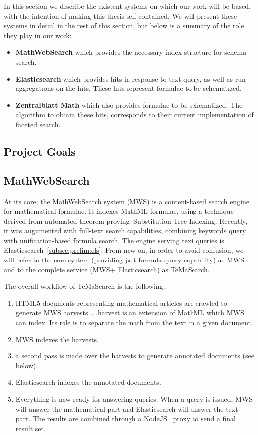 \documentclass[a4paper,11pt,oneside]{article}
\def\MWS{\textsf{MWS}\xspace}
\def\mws{\textsf{MathWebSearch}\xspace}
\def\tms{\textsf{TeMaSearch}\xspace}
\def\els{\textsf{Elasticsearch}\xspace}
\def\mathml{\textsf{MathML}\xspace}
\begin{document}
In this section we describe the existent systems on which our work will be
based, with the intention of making this thesis self-contained. We will
present these systems in detail in the rest of this section, but
below is a summary of the role they play in our work:
\begin{itemize}
\item \textbf{MathWebSearch} which provides the necessary index structure
for schema search.
\item \textbf{Elasticsearch} which provides hits in response to text query,
    as well as run aggregations on the hits.
    These hits represent formulae to be schematized.
\item \textbf{Zentralblatt Math} which also provides formulae to be
    schematized. The algorithm to obtain these hits, corresponds to their
    current implementation of faceted search.
\end{itemize}

\subsection{Project Goals}\label{subsec:prelim:goals}

\subsection{MathWebSearch}\label{subsec:prelim:mws}

At its core, the \mws system (MWS) is a content-based search engine for
mathematical formulae. It indexes MathML formulae, using a technique derived
from automated theorem proving: Substitution Tree Indexing.
Recently, it was augumented with full-text search capabilities, combining
keywords query with unification-based formula search. The engine serving 
text queries is \els~\ref{subsec:prelim:els}.
From now on, in order to avoid confusion, we will refer to the core system
(providing just formula query capability) as \MWS and to the complete service
(\MWS + \els) as \tms.

The overall workflow of \tms is the following:
\begin{enumerate}
    \item HTML5 documents representing mathematical articles are
        crawled to generate \MWS harvests~\cite{mwsharvest:online}.
        \textsf{.harvest} is an extension of \mathml which \MWS can index. Its
        role is to separate the math from the text in a given document. 
    \item \MWS indexes the harvests. 
    \item a second pass is made over the harvests to generate annotated
        documents (see below). 
    \item \els indexes the annotated documents.
    \item Everything is now ready for answering queries. When a query is
        issued, \MWS will answer the mathematical part and \els will answer the
        text part.  The results are combined through a
        NodeJS~\cite{nodejs:online} proxy to send a final result set.
\end{enumerate}
\end{document}
